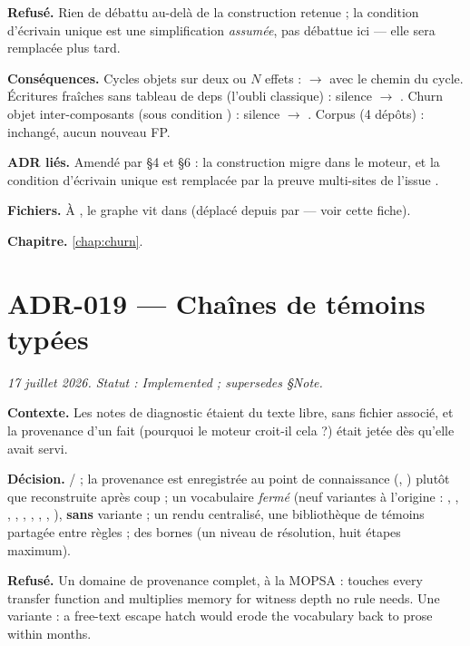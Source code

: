 \textbf{Refusé.} Rien de débattu au-delà de la construction retenue ; la
condition d'écrivain unique est une simplification \emph{assumée}, pas
débattue ici --- elle sera remplacée plus tard.

\textbf{Conséquences.} Cycles objets sur deux ou $N$ effets : \Info{} $\to$
\Error{} avec le chemin du cycle. Écritures fraîches sans tableau de deps
(l'oubli classique) : silence $\to$ \Error{}. Churn objet inter-composants
(sous condition ) : silence $\to$ \Warning{}. Corpus (4
dépôts) : inchangé, aucun nouveau FP.

\textbf{ADR liés.} Amendé par  §4 et §6 : la construction migre dans
le moteur, et la condition d'écrivain unique est remplacée par la preuve
multi-sites de l'issue .

\textbf{Fichiers.} À \code{\snapshotCommit}, le graphe vit dans
 (déplacé depuis  par  ---
voir cette fiche).

\textbf{Chapitre.} \cref{chap:churn}.

\section{ADR-019 --- Chaînes de témoins typées}
\label{adr:19}
\noindent\textit{17 juillet 2026. Statut : Implemented ; supersedes  §Note.}

\textbf{Contexte.} Les notes de diagnostic étaient du texte libre, sans
fichier associé, et la provenance d'un fait (pourquoi le moteur croit-il
cela ?) était jetée dès qu'elle avait servi.

\textbf{Décision.} / ; la provenance est
enregistrée \og au point de connaissance\fg{} (,
) plutôt que reconstruite après coup ; un vocabulaire
\emph{fermé}  (neuf variantes à l'origine : ,
, , , , ,
, , ), \textbf{sans} variante
 ; un rendu centralisé, une bibliothèque de témoins
partagée entre règles ; des bornes (un niveau de résolution, huit étapes
maximum).

\textbf{Refusé.} Un domaine de provenance complet, à la MOPSA :
\og touches every transfer function and multiplies memory for witness depth
no rule needs\fg{}. Une variante  : \og a free-text
escape hatch would erode the vocabulary back to prose within months\fg{}.

